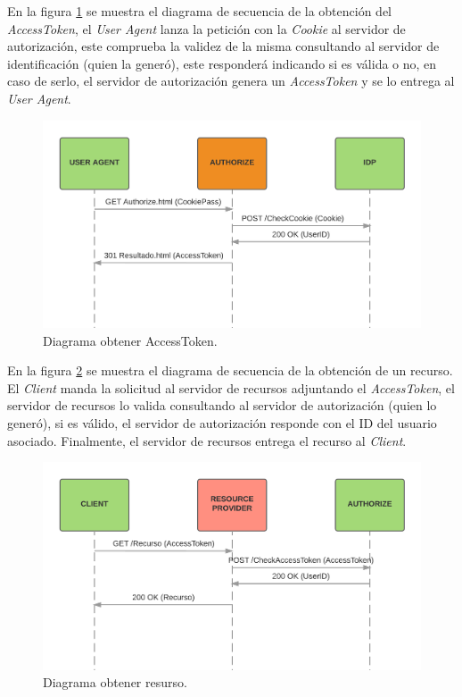 \documentclass[a4,12pt,onecolum]{article}
\begin{document}
En la figura \ref{fig:oauth3} se muestra el diagrama de secuencia de la obtención del \emph{AccessToken}, el \emph{User Agent} lanza la petición con la \emph{Cookie} al servidor de autorización, este comprueba la validez de la misma consultando al servidor de identificación (quien la generó), este responderá indicando si es válida o no, en caso de serlo, el servidor de autorización genera un \emph{AccessToken} y se lo entrega al \emph{User Agent}. \\

\begin{figure}[htbp]
\centering
\includegraphics[width=1.1\textwidth]{./images/oauth/diagrama_secuencia_getToken.png}
\caption{Diagrama obtener AccessToken.}
\label{fig:oauth3}
\end{figure}


En la figura \ref{fig:oauth4} se muestra el diagrama de secuencia de la obtención de un recurso. El \emph{Client} manda la solicitud al servidor de recursos adjuntando el \emph{AccessToken}, el servidor de recursos lo valida consultando al servidor de autorización (quien lo generó), si es válido, el servidor de autorización responde con el ID del usuario asociado. Finalmente, el servidor de recursos entrega el recurso al \emph{Client}.	\\

\begin{figure}[htbp]
\centering
\includegraphics[width=1.1\textwidth]{./images/oauth/diagrama_obtener_recurso.png}
\caption{Diagrama obtener resurso.}
\label{fig:oauth4}
\end{figure}
\end{document}
